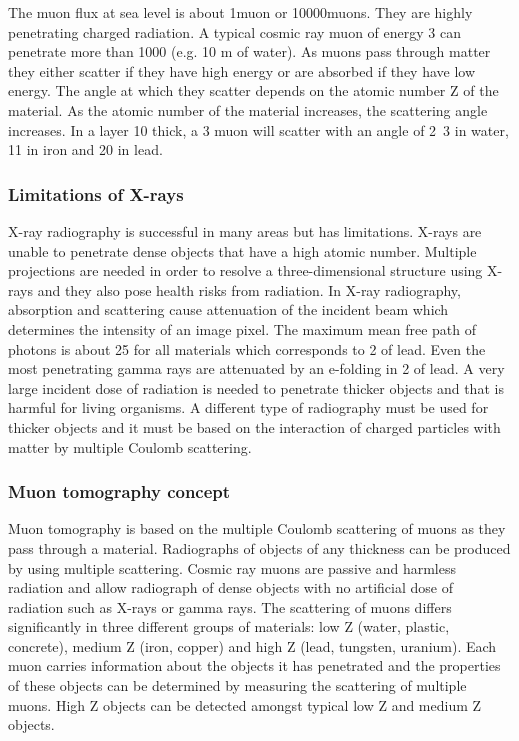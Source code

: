 \documentclass[twoside,titlepage,11pt,twocolumn,a4paper]{article}
\begin{document}
The muon flux at sea level is about
\unit{1}{muon\usk\rpsquare{\centi\metre}\usk\reciprocal\minute}
\citep{statisticalRec2007} or
\unit{10000}{muons\usk\rpsquare\metre\usk\reciprocal\minute}. They are
highly penetrating charged radiation.  A typical cosmic ray muon of
energy \unit{3}{\giga\electronvolt} can penetrate more than
\unit{1000}{\gram\usk\rpsquare{\centi\metre}} (e.g. 10 m of water). As
muons pass through matter they either scatter if they have high energy
or are absorbed if they have low energy. The angle at which they
scatter depends on the atomic number Z of the
material. As the atomic number of the material increases, the
scattering angle increases. In a layer \unit{10}{\centi\metre} thick,
a \unit{3}{\giga\electronvolt} muon will scatter with an angle of
\unit{2.3}{\milli\radian} in water, \unit{11}{\milli\radian} in iron
and \unit{20}{\milli\radian} in lead. \citep{Borozdin2003}

\subsubsection{Limitations of X-rays}
X-ray radiography is successful in many areas but has
limitations. X-rays are unable to penetrate dense objects that have a
high atomic number. Multiple projections are needed in order to
resolve a three-dimensional structure using X-rays and they also pose
health risks from radiation. In X-ray radiography, absorption and
scattering cause attenuation of the incident beam which determines the
intensity of an image pixel. The maximum mean free path of photons is
about \unit{25}{\gram\usk\rpsquare{\centi\metre}} for all materials
which corresponds to \unit{2}{\centi\metre} of lead.
\citep{Borozdin2003} Even the most penetrating gamma rays are
attenuated by an e-folding in \unit{2}{\centi\metre} of lead. A very
large incident dose of radiation is needed to penetrate thicker
objects and that is harmful for living organisms.
\citep{Priedhorsky2003} A different type of radiography must be used
for thicker objects and it must be based on the interaction of charged
particles with matter by multiple Coulomb scattering.
\citep{Borozdin2003}

\subsubsection{Muon tomography concept}
Muon tomography is based on the multiple Coulomb scattering of muons
as they pass through a material. Radiographs of objects of any
thickness can be produced by using multiple scattering.  Cosmic ray
muons are passive and harmless radiation and allow radiograph of dense
objects with no artificial dose of radiation such as X-rays or gamma
rays. The scattering of muons differs significantly in three different
groups of materials: low Z (water, plastic, concrete), medium Z (iron,
copper) and high Z (lead, tungsten, uranium). \citep{imageRec2004}
Each muon carries information about the objects it has penetrated and
the properties of these objects can be determined by measuring the
scattering of multiple muons. High Z objects can be detected amongst
typical low Z and medium Z objects. \citep{statisticalRec2007}
\end{document}
